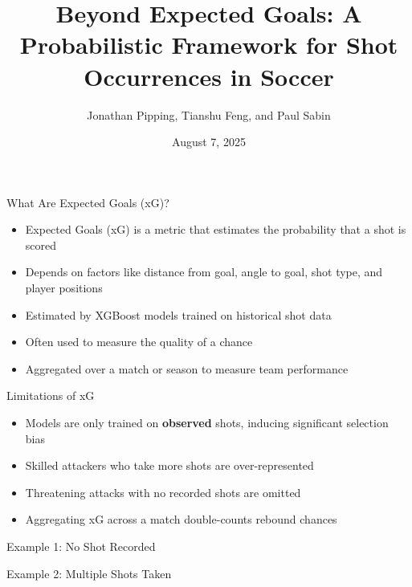 \documentclass{beamer}
\title[Beyond Expected Goals]{Beyond Expected Goals: A Probabilistic Framework for Shot Occurrences in Soccer}
\author[Pipping, Feng, and Sabin]{Jonathan Pipping, Tianshu Feng, and Paul Sabin}
\date{August 7, 2025}
\institute[UPenn]{University of Pennsylvania}
\begin{document}
\frame{\titlepage}

\begin{frame}{What Are Expected Goals (xG)?}
\begin{itemize}
\item Expected Goals (xG) is a metric that estimates the probability that a shot is scored
\item Depends on factors like distance from goal, angle to goal, shot type, and player positions
\item Estimated by XGBoost models trained on historical shot data
\item Often used to measure the quality of a chance
\item Aggregated over a match or season to measure team performance
\end{itemize}
\end{frame}

\begin{frame}{Limitations of xG}
\begin{itemize}
\item Models are only trained on \textbf{observed} shots, inducing significant selection bias
\item Skilled attackers who take more shots are over-represented
\item Threatening attacks with no recorded shots are omitted
\item Aggregating xG across a match double-counts rebound chances
\end{itemize}
\end{frame}

\begin{frame}{Example 1: No Shot Recorded}

\end{frame}

\begin{frame}{Example 2: Multiple Shots Taken}

\end{frame}
\end{document}
